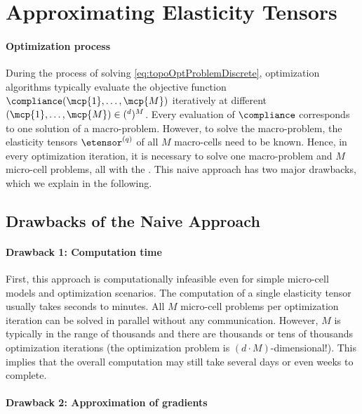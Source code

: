 \section{Approximating Elasticity Tensors}
\label{sec:62tensors}

\paragraph{Optimization process}


During the process of solving \cref{eq:topoOptProblemDiscrete},
optimization algorithms typically
evaluate the objective function $\compliance(\mcp{1}, \dotsc, \mcp{M})$
iteratively at different 
$(\mcp{1}, \dotsc, \mcp{M}) \in (\real^d)^M$.
Every evaluation of $\compliance$ corresponds to one solution of a
macro-problem.
However, to solve the macro-problem,
the elasticity tensors $\etensor^{(q)}$ of all $M$ macro-cells
need to be known.
Hence, in every optimization iteration, it is necessary to solve
one macro-problem and $M$ micro-cell problems,
all with the \fem.
This naive approach has two major drawbacks, which we explain in
the following.



\subsection{Drawbacks of the Naive Approach}
\label{sec:621drawbacks}

\paragraph{Drawback 1: Computation time}

First, this approach is computationally infeasible
even for simple micro-cell models and optimization scenarios.
The computation of a single elasticity tensor usually takes seconds to
minutes.
All $M$ micro-cell problems per optimization iteration
can be solved in parallel without any communication.
However, $M$ is typically in the range of thousands and
there are thousands or tens of thousands optimization iterations
(the optimization problem is $(d \cdot M)$-dimensional!).
This implies that the overall computation may still take
several days or even weeks to complete.

\paragraph{Drawback 2: Approximation of gradients}

